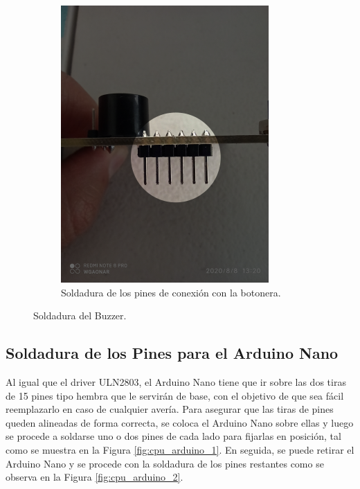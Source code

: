 \documentclass{article}
\begin{document}
\begin{figure}[H]
\begin{subfigure}[t]{0.3\textwidth}
        \includegraphics[width=0.9\columnwidth, height=1.2\columnwidth]{images/CPU/cpu_pines_botonera_1.png}
        \caption{Soldadura de los pines de conexión con la botonera.}
        \label{fig:cpu_pines_botonera_1}
    \end{subfigure}
    \caption{Soldadura del Buzzer.}
    \label{fig:cpu_buzzer}
\end{figure}

\subsection{Soldadura de los Pines para el Arduino Nano}
Al igual que el driver ULN2803, el Arduino Nano tiene que ir sobre las dos tiras de 15 pines tipo hembra que le servirán de base, con el objetivo de que sea fácil reemplazarlo en caso de cualquier avería. Para asegurar que las tiras de pines queden alineadas de forma correcta, se coloca el Arduino Nano sobre ellas y luego se procede a soldarse uno o dos pines de cada lado para fijarlas en posición, tal como se muestra en la Figura \ref{fig:cpu_arduino_1}. En seguida, se puede retirar el Arduino Nano y se procede con la soldadura de los pines restantes como se observa en la Figura \ref{fig:cpu_arduino_2}. 
\end{document}
